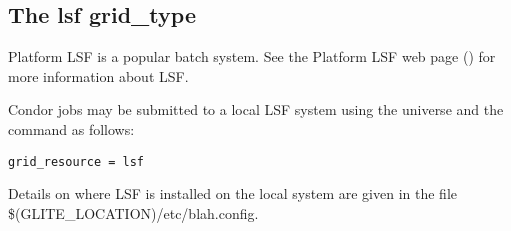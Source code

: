 
\subsection{\label{sec:LSF}The lsf grid\_type }

Platform LSF is a popular batch system. See the Platform LSF web page
()
for more information about LSF.

Condor jobs may be submitted to a local LSF system
using the  universe and the
 command as follows:
\begin{verbatim}
grid_resource = lsf
\end{verbatim}

Details on where LSF is installed on the local system are
given in the file \$(GLITE\_LOCATION)/etc/blah.config.
